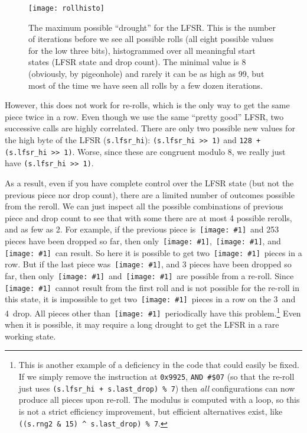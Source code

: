 \documentclass[twocolumn]{article}
\newcommand\tetrispiece[1]{\,\texttt{[image: \#1]}\hspace{0.1em}}
\newcommand\ihoriz{\tetrispiece{i_horiz}}
\newcommand\squarepiece{\tetrispiece{square}}
\newcommand\tup{\tetrispiece{t_up}}
\newcommand\jdown{\tetrispiece{j_down}}
\newcommand\zhoriz{\tetrispiece{z_horiz}}
\newcommand\shoriz{\tetrispiece{s_horiz}}
\newcommand\lup{\tetrispiece{l_up}}
\begin{document}
\begin{figure}
  \texttt{[image: rollhisto]}
  \caption {
    The maximum possible ``drought'' for the LFSR. This is
    the number of iterations before we see all possible rolls (all
    eight possible values for the low three bits), histogrammed
    over all meaningful start states (LFSR state and drop count).
    The minimal value is 8 (obviously, by pigeonhole) and rarely
    it can be as high as 99, but most of the time we have seen
    all rolls by a few dozen iterations.
    } \label{fig:rollhisto}
\end{figure}

However, this does not work for re-rolls, which is the only way to get
the same piece twice in a row. Even though we use the same ``pretty
good'' LFSR, two successive calls are highly correlated. There are
only two possible new values for the high byte of the LFSR
(\verb|s.lfsr_hi|): \verb|(s.lfsr_hi >> 1)| and \verb|128 + (s.lfsr_hi >> 1)|.
Worse, since these are congruent modulo $8$, we really just have
\verb|(s.lfsr_hi >> 1)|.
 
As a result, even if you have complete control over the LFSR state
(but not the previous piece nor drop count), there are a limited
number of outcomes possible from the reroll. We can just inspect all
the possible combinations of previous piece and drop count to see that
with some there are at most 4 possible rerolls, and as few as 2. For
example, if the previous piece is \shoriz\ and 253 pieces have been
dropped so far, then only \tup, \shoriz, and \jdown\ can result. So
here it is possible to get two \shoriz\ pieces in a row. But if the
last piece was \ihoriz, and 3 pieces have been dropped so far, then
only \zhoriz\ and \lup\ are possible from a re-roll. Since
\ihoriz\ cannot result from the first roll and is not possible for the
re-roll in this state, it is impossible to get two \ihoriz\ pieces in
a row on the 3\rd\ and 4\th\ drop. All pieces other than
\squarepiece\ periodically have this problem.\!\footnote{This is
  another example of a deficiency in the code that could easily be
  fixed. If we simply remove the instruction at {\tt 0x9925},
  \verb+AND #$07+ (so that the re-roll just uses
  \verb|(s.lfsr_hi + s.last_drop) % 7|) then {\it all} configurations
  can now produce all pieces upon re-roll. The modulus is computed
  with a loop, so this is not a strict efficiency improvement, but
  efficient alternatives exist, like \verb|((s.rng2 & 15) ^ s.last_drop) % 7|.
} Even when it is possible, it may
require a long drought to get the LFSR in a rare working state.
\end{document}
